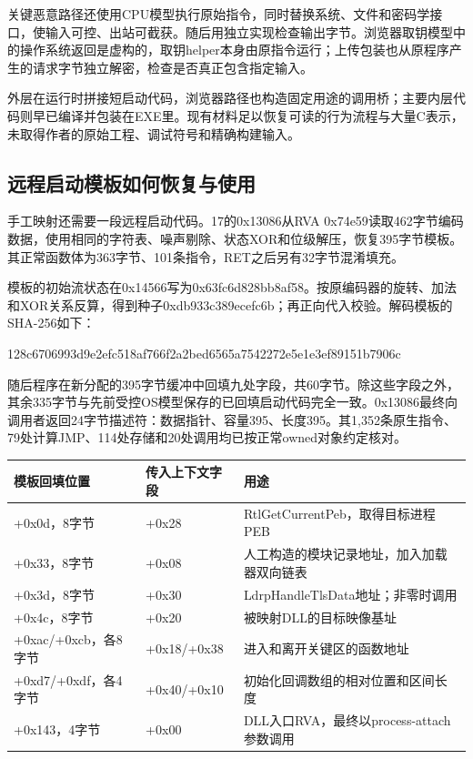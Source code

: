 \documentclass[UTF8,a4paper,zihao=5,fontset=windows]{ctexart}
\newcommand{\code}[1]{{\ttfamily\small #1}}
\newcommand{\smallcode}[1]{{\ttfamily\footnotesize #1}}
\begin{document}
关键恶意路径还使用CPU模型执行原始指令，同时替换系统、文件和密码学接口，使输入可控、出站可截获。随后用独立实现检查输出字节。浏览器取钥模型中的操作系统返回是虚构的，取钥helper本身由原指令运行；上传包装也从原程序产生的请求字节独立解密，检查是否真正包含指定输入。

外层在运行时拼接短启动代码，浏览器路径也构造固定用途的调用桥；主要内层代码则早已编译并包装在EXE里。现有材料足以恢复可读的行为流程与大量C表示，未取得作者的原始工程、调试符号和精确构建输入。

\subsection{远程启动模板如何恢复与使用}
手工映射还需要一段远程启动代码。17的\code{0x13086}从\code{RVA 0x74e59}读取462字节编码数据，使用相同的字符表、噪声剔除、状态XOR和位级解压，恢复395字节模板。其正常函数体为363字节、101条指令，\code{RET}之后另有32字节混淆填充。

模板的初始流状态在\code{0x14566}写为\code{0x63fc6d828bb8af58}。按原编码器的旋转、加法和XOR关系反算，得到种子\code{0xdb933c389ecefc6b}；再正向代入校验。解码模板的SHA-256如下：
\begin{center}\smallcode{128c6706993d9e2efc518af766f2a2bed6565a7542272e5e1e3ef89151b7906c}\end{center}

随后程序在新分配的395字节缓冲中回填九处字段，共60字节。除这些字段之外，其余335字节与先前受控OS模型保存的已回填启动代码完全一致。\code{0x13086}最终向调用者返回24字节描述符：数据指针、容量395、长度395。其1,352条原生指令、79处计算JMP、114处存储和20处调用均已按正常owned对象约定核对。

\begin{longtable}{@{}L{27mm}L{37mm}L{86mm}@{}}\toprule 模板回填位置 & 传入上下文字段 & 用途\\\midrule\endhead
\code{+0x0d}，8字节 & \code{+0x28} & \code{RtlGetCurrentPeb}，取得目标进程PEB\\
\code{+0x33}，8字节 & \code{+0x08} & 人工构造的模块记录地址，加入加载器双向链表\\
\code{+0x3d}，8字节 & \code{+0x30} & \code{LdrpHandleTlsData}地址；非零时调用\\
\code{+0x4c}，8字节 & \code{+0x20} & 被映射DLL的目标映像基址\\
\code{+0xac/+0xcb}，各8字节 & \code{+0x18/+0x38} & 进入和离开关键区的函数地址\\
\code{+0xd7/+0xdf}，各4字节 & \code{+0x40/+0x10} & 初始化回调数组的相对位置和区间长度\\
\code{+0x143}，4字节 & \code{+0x00} & DLL入口RVA，最终以process-attach参数调用\\\bottomrule\end{longtable}
\end{document}

